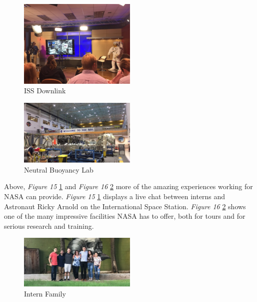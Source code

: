 \documentclass{article}
\begin{document}
\begin{figure}[!htb]
  \centering
  \includegraphics[width=0.5\textwidth]{assets/videodemonstration.png}
  \caption{ISS Downlink}
  \label{fig:videodemonstration}
\end{figure}

\begin{figure}[!htb]
  \centering
  \includegraphics[width=0.5\textwidth]{assets/welcometonbl.png}
  \caption{Neutral Buoyancy Lab}
  \label{fig:welcometonbl}
\end{figure}

Above, \textit{Figure 15} \ref{fig:videodemonstration} and \textit{Figure 16} \ref{fig:welcometonbl} more of the amazing experiences working for NASA can provide. \textit{Figure 15} \ref{fig:videodemonstration} displays a live chat between interns and Astronaut Ricky Arnold on the International Space Station. \textit{Figure 16} \ref{fig:welcometonbl} shows one of the many impressive facilities NASA has to offer, both for tours and for serious research and training.

\begin{figure}[!htb]
  \centering
  \includegraphics[width=0.5\textwidth]{assets/ronniewithfriends.png}
  \caption{Intern Family}
  \label{fig:ronniewithfriends}
\end{figure}
\end{document}
